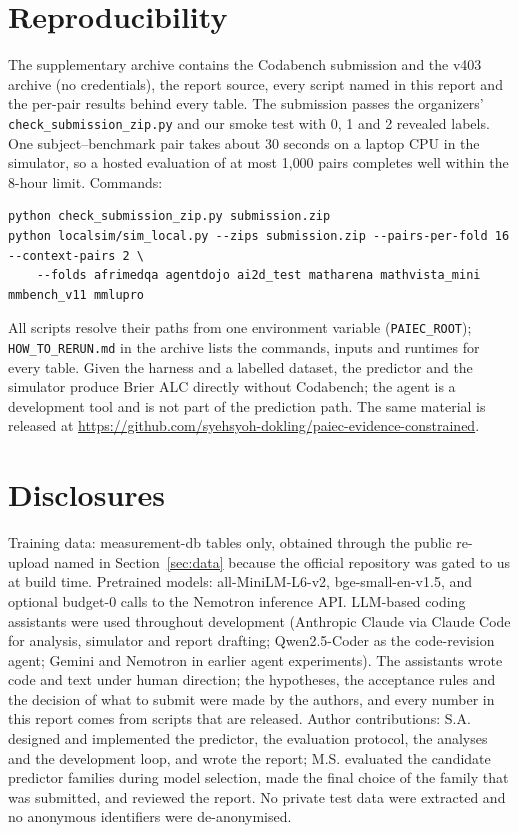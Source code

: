 \documentclass{article}
\begin{document}
\section{Reproducibility}
\label{sec:repro}

The supplementary archive contains the Codabench submission and the v403 archive (no credentials), the report source, every script named in this report and the per-pair results behind every table. The submission passes the organizers' \texttt{check\_submission\_zip.py} and our smoke test with 0, 1 and 2 revealed labels. One subject--benchmark pair takes about 30 seconds on a laptop CPU in the simulator, so a hosted evaluation of at most 1{,}000 pairs completes well within the 8-hour limit. Commands:
\begin{verbatim}
python check_submission_zip.py submission.zip
python localsim/sim_local.py --zips submission.zip --pairs-per-fold 16 --context-pairs 2 \
    --folds afrimedqa agentdojo ai2d_test matharena mathvista_mini mmbench_v11 mmlupro
\end{verbatim}
All scripts resolve their paths from one environment variable (\texttt{PAIEC\_ROOT}); \texttt{HOW\_TO\_RERUN.md} in the archive lists the commands, inputs and runtimes for every table. Given the harness and a labelled dataset, the predictor and the simulator produce Brier ALC directly without Codabench; the agent is a development tool and is not part of the prediction path. The same material is released at \url{https://github.com/syehsyoh-dokling/paiec-evidence-constrained}.

\section*{Disclosures}
Training data: measurement-db tables only, obtained through the public re-upload named in Section~\ref{sec:data} because the official repository was gated to us at build time. Pretrained models: all-MiniLM-L6-v2, bge-small-en-v1.5, and optional budget-0 calls to the Nemotron inference API. LLM-based coding assistants were used throughout development (Anthropic Claude via Claude Code for analysis, simulator and report drafting; Qwen2.5-Coder as the code-revision agent; Gemini and Nemotron in earlier agent experiments). The assistants wrote code and text under human direction; the hypotheses, the acceptance rules and the decision of what to submit were made by the authors, and every number in this report comes from scripts that are released. Author contributions: S.A. designed and implemented the predictor, the evaluation protocol, the analyses and the development loop, and wrote the report; M.S. evaluated the candidate predictor families during model selection, made the final choice of the family that was submitted, and reviewed the report. No private test data were extracted and no anonymous identifiers were de-anonymised.
\end{document}
